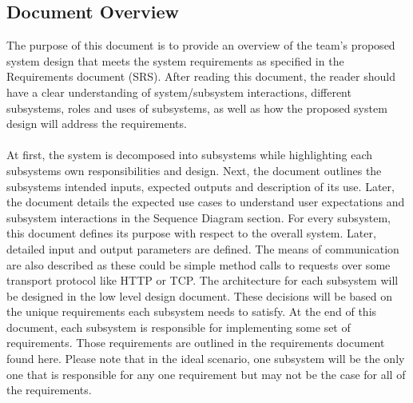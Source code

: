 \documentclass[11pt]{article}
\begin{document}
\subsection{Document Overview}
The purpose of this document is to provide an overview of the team's proposed system design that meets the system requirements as specified in the Requirements document (SRS). After reading this document, the reader should have a clear understanding of system/subsystem interactions, different subsystems, roles and uses of subsystems, as well as how the proposed system design will address the requirements. \\ \\
At first, the system is decomposed into subsystems while highlighting each subsystems own responsibilities and design. Next, the document outlines the subsystems intended inputs, expected outputs and description of its use. Later, the document details the expected use cases to understand user expectations and subsystem interactions in the Sequence Diagram section. For every subsystem, this document defines its purpose with respect to the overall system. Later, detailed input and output parameters are defined. The means of communication are also described as these could be simple method calls to requests over some transport protocol like HTTP or TCP. The architecture for each subsystem will be designed in the low level design document. These decisions will be based on the unique requirements each subsystem needs to satisfy. At the end of this document, each subsystem is responsible for implementing some set of requirements. Those requirements are outlined in the requirements document found here. %
Please note that in the ideal scenario, one subsystem will be the only one that is responsible for any one requirement but may not be the case for all of the requirements. 
\end{document}
